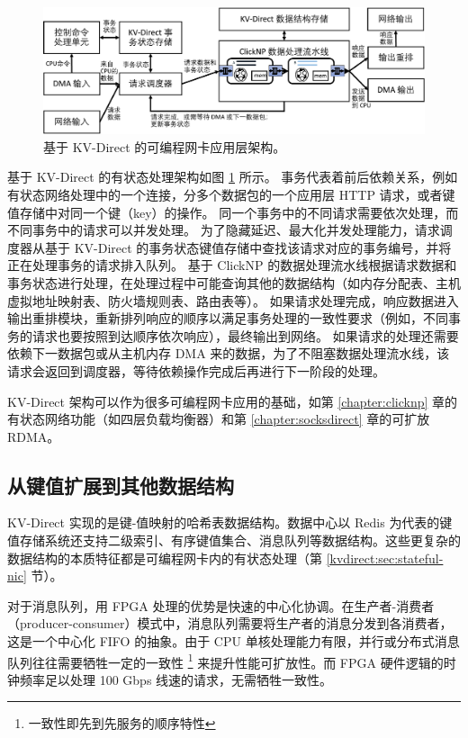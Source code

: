 \begin{figure}[htbp]
	\centering
	\includegraphics[width=1.0\textwidth]{../figures/kvdirect_arch.pdf}
	\caption{基于 KV-Direct 的可编程网卡应用层架构。}
	\label{arch:fig:kvdirect_arch_application}
\end{figure}

基于 KV-Direct 的有状态处理架构如图 \ref{arch:fig:kvdirect_arch_application} 所示。
事务代表着前后依赖关系，例如有状态网络处理中的一个连接，分多个数据包的一个应用层 HTTP 请求，或者键值存储中对同一个键（key）的操作。
同一个事务中的不同请求需要依次处理，而不同事务中的请求可以并发处理。
为了隐藏延迟、最大化并发处理能力，请求调度器从基于 KV-Direct 的事务状态键值存储中查找该请求对应的事务编号，并将正在处理事务的请求排入队列。
基于 ClickNP 的数据处理流水线根据请求数据和事务状态进行处理，在处理过程中可能查询其他的数据结构（如内存分配表、主机虚拟地址映射表、防火墙规则表、路由表等）。
如果请求处理完成，响应数据进入输出重排模块，重新排列响应的顺序以满足事务处理的一致性要求（例如，不同事务的请求也要按照到达顺序依次响应），最终输出到网络。
如果请求的处理还需要依赖下一数据包或从主机内存 DMA 来的数据，为了不阻塞数据处理流水线，该请求会返回到调度器，等待依赖操作完成后再进行下一阶段的处理。

KV-Direct 架构可以作为很多可编程网卡应用的基础，如第 \ref{chapter:clicknp} 章的有状态网络功能（如四层负载均衡器）和第 \ref{chapter:socksdirect} 章的可扩放 RDMA。

\subsection{从键值扩展到其他数据结构}
\label{kvdirect:sec:data-structure}

KV-Direct 实现的是键-值映射的哈希表数据结构。数据中心以 Redis \cite{redis} 为代表的键值存储系统还支持二级索引、有序键值集合、消息队列等数据结构。这些更复杂的数据结构的本质特征都是可编程网卡内的有状态处理（第 \ref{kvdirect:sec:stateful-nic} 节）。

对于消息队列，用 FPGA 处理的优势是快速的中心化协调。在生产者-消费者（producer-consumer）模式中，消息队列需要将生产者的消息分发到各消费者，这是一个中心化 FIFO 的抽象。由于 CPU 单核处理能力有限，并行或分布式消息队列往往需要牺牲一定的一致性 \footnote{一致性即先到先服务的顺序特性} 来提升性能可扩放性。而 FPGA 硬件逻辑的时钟频率足以处理 100 Gbps 线速的请求，无需牺牲一致性。


